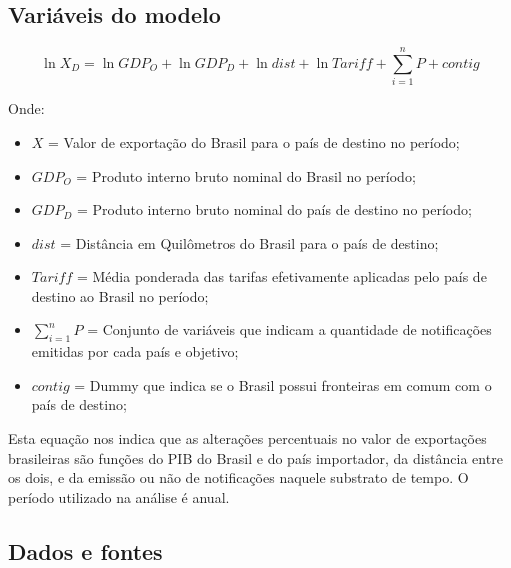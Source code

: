 \documentclass[12pt, a4paper]{article}
\begin{document}
\subsection{Variáveis do modelo}

\begin{equation}
    \ln X_{D} = 
    \ln GDP_{O} 
    + \ln GDP_{D} 
    + \ln dist 
    + \ln Tariff 
    + \sum_{i=1}^{n} P 
    + contig 
\end{equation}

Onde:

\begin{itemize}
    \item $X$ = Valor de exportação do Brasil para o país de destino no período;
    \item $GDP_{O}$ = Produto interno bruto nominal do Brasil no período;
    \item $GDP_{D}$ = Produto interno bruto nominal do país de destino no período;
    \item $dist$ = Distância em Quilômetros  do Brasil para o país de destino;
    \item $Tariff$ = Média ponderada das tarifas efetivamente aplicadas pelo país de destino ao Brasil no período;
    \item $\sum_{i=1}^{n} P$ = Conjunto de variáveis que indicam a quantidade de notificações emitidas por cada país e objetivo;
    \item $contig$ = Dummy que indica se o Brasil possui fronteiras em comum com o país de destino;
\end{itemize}

Esta equação nos indica que as alterações percentuais no valor de exportações brasileiras são funções do PIB do Brasil e do país importador, da distância entre os dois, e da emissão ou não de notificações naquele substrato de tempo. O período utilizado na análise é anual.

\subsection{Dados e fontes}
\end{document}
